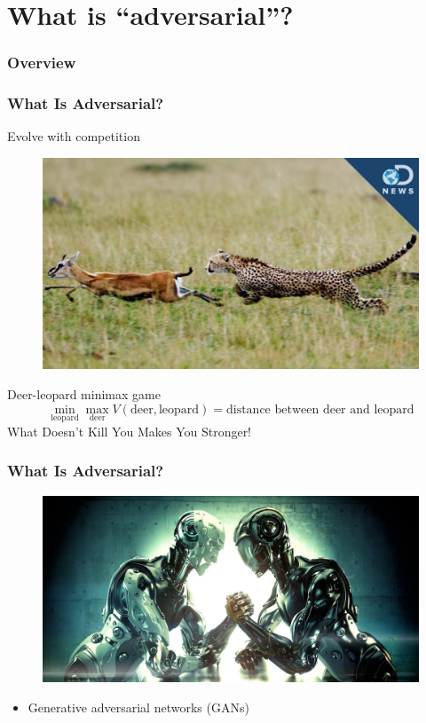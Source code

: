 \documentclass{beamer}
\begin{document}
\section{What is ``adversarial''?}

\begin{frame}
\frametitle{Overview}
\tableofcontents[currentsection]
\end{frame}

\begin{frame}
\frametitle{What Is Adversarial?}
Evolve with competition
\begin{figure}
  \includegraphics[height=.45\textheight]{leopard_deer.png}
\end{figure}
Deer-leopard minimax game
$$\min_{\text{leopard}} \max_{\text{deer}} V(\text{deer}, \text{leopard}) = \text{distance between deer and leopard}$$
What Doesn't Kill You Makes You Stronger!
\end{frame}

\begin{frame}
\frametitle{What Is Adversarial?}
\begin{figure}
  \includegraphics[height=.6\textheight]{robotic_arm_wrestling.jpg}
\end{figure}
\begin{itemize}
  \item Generative adversarial networks (GANs)
\end{itemize}
\end{frame}
\end{document}
